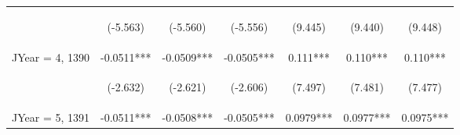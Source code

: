 \documentclass[]{article}
\begin{document}
\begin{center}
\begin{tabular}{lcccccc}
        \vspace{4pt}     & \begin{footnotesize}(-5.563)\end{footnotesize} & \begin{footnotesize}(-5.560)\end{footnotesize} & \begin{footnotesize}(-5.556)\end{footnotesize} & \begin{footnotesize}(9.445)\end{footnotesize}  & \begin{footnotesize}(9.440)\end{footnotesize}  & \begin{footnotesize}(9.448)\end{footnotesize}  \\
        JYear = 4, 1390  & -0.0511***                                     & -0.0509***                                     & -0.0505***                                     & 0.111***                                       & 0.110***                                       & 0.110***                                       \\
        \vspace{4pt}     & \begin{footnotesize}(-2.632)\end{footnotesize} & \begin{footnotesize}(-2.621)\end{footnotesize} & \begin{footnotesize}(-2.606)\end{footnotesize} & \begin{footnotesize}(7.497)\end{footnotesize}  & \begin{footnotesize}(7.481)\end{footnotesize}  & \begin{footnotesize}(7.477)\end{footnotesize}  \\
        JYear = 5, 1391  & -0.0511***                                     & -0.0508***                                     & -0.0505***                                     & 0.0979***                                      & 0.0977***                                      & 0.0975***                                      \\

\end{tabular}
\end{center}
\end{document}
